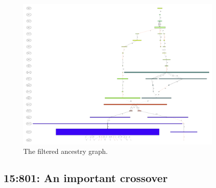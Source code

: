 \begin{figure}[tb!p] %
	\begin{center}
		\includegraphics[width=0.9\textwidth]{../figures/run0_RBM_color_filtered_30000}
	\end{center}
	\caption{The filtered ancestry graph.}
	\label{fig:run0filtered}       %
\end{figure}

\subsection{15:801: An important crossover}
\label{sec:15:801}

